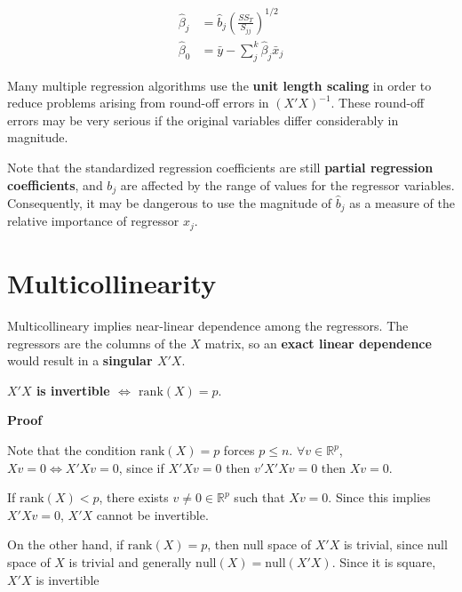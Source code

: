 \documentclass[12pt]{article}
\newenvironment{Shaded}{\begin{snugshade}}{\end{snugshade}}
\begin{document}
$$
\begin{aligned}
\hat{\beta}_j &= \hat{b}_j \left( \frac{SS_T}{S_{jj}} \right)^{1/2} \\[8pt]
\hat{\beta}_0 &= \bar{y} - \sum_j^k \hat{\beta}_j \bar{x}_j
\end{aligned}
$$

Many multiple regression algorithms use the \textbf{unit length scaling} in order to reduce problems arising from round-off errors in $(X'X)^{-1}$. These round-off errors may be very serious if the original variables differ considerably in magnitude. 

Note that the standardized regression coefficients are still \textbf{partial regression coefficients}, and $b_j$ are affected by the range of values for the regressor variables. Consequently, it may be dangerous to use the magnitude of $\hat{b}_j$ as a measure of the relative importance of regressor $x_j$. 



\section{Multicollinearity}

Multicollineary implies near-linear dependence among the regressors. The regressors are the columns of the $X$ matrix, so an \textbf{exact linear dependence} would result in a \textbf{singular $X'X$}.

\textbf{$X'X$ is invertible $\Leftrightarrow$ $\mathrm{rank}(X) = p$}. 

\bigskip

\begin{Shaded}
\textbf{Proof}

\bigskip
Note that the condition $\mathrm{rank}(X) = p$ forces $p \le n$. $\forall v \in \mathbb{R}^p$, $Xv = 0 \Leftrightarrow X'Xv = 0$, since if $X'Xv = 0$ then $v' X' Xv=0$ then $Xv=0$. 

\smallskip
If $\mathrm{rank} (X) < p$, there exists $v \neq 0 \in \mathbb{R}^p$ such that $X v = 0$. Since this implies $X'Xv=0$, $X'X$ cannot be invertible.

\smallskip
On the other hand, if $\mathrm{rank}(X) = p$, then null space of $X'X$ is trivial, since null space of $X$ is trivial and generally $\mathrm{null}(X) = \mathrm{null}(X'X)$. Since it is square, $X'X$ is invertible
\end{Shaded}
\end{document}
